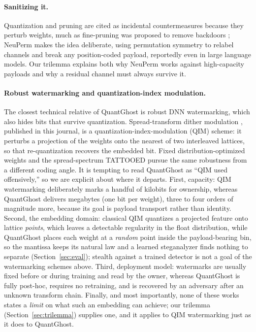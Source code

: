 \documentclass[a4paper,fleqn]{cas-dc}
\theoremstyle{plain}
\theoremstyle{remark}
\newcommand{\sys}{\mbox{QuantGhost}}
\begin{document}
\paragraph{Sanitizing it.} Quantization and pruning are cited as incidental
countermeasures because they perturb weights, much as fine-pruning was proposed to
remove backdoors \citep{liu2018finepruning}; NeuPerm \citep{gilkarov2025neuperm} makes
the idea deliberate, using permutation symmetry to relabel channels and break any
position-coded payload, reportedly even in large language models. Our trilemma explains
both why NeuPerm works against high-capacity payloads and why a residual channel must
always survive it.

\paragraph{Robust watermarking and quantization-index modulation.} The closest
technical relative of \sys{} is robust DNN watermarking, which also hides bits that
survive quantization. Spread-transform dither modulation \citep{li2021stdm}, published
in this journal, is a quantization-index-modulation (QIM) scheme: it perturbs a
projection of the weights onto the nearest of two interleaved lattices, so that
re-quantization recovers the embedded bit. Fixed distribution-optimized weights
\citep{tondi2022robust} and the spread-spectrum TATTOOED \citep{pagnotta2022tattooed}
pursue the same robustness from a different coding angle. It is tempting to read \sys{}
as ``QIM used offensively,'' so we are explicit about where it departs. First, capacity:
QIM watermarking deliberately marks a handful of kilobits for ownership, whereas \sys{}
delivers megabytes (one bit per weight), three to four orders of magnitude more, because
its goal is payload transport rather than identity. Second, the embedding domain:
classical QIM quantizes a projected feature onto lattice \emph{points}, which leaves a
detectable regularity in the float distribution, while \sys{} places each weight at a
\emph{random} point inside the payload-bearing bin, so the mantissa keeps its natural law
and a learned steganalyzer finds nothing to separate (Section~\ref{sec:eval}); stealth
against a trained detector is not a goal of the watermarking schemes above. Third,
deployment model: watermarks are usually fixed before or during training and read by the
owner, whereas \sys{} is fully post-hoc, requires no retraining, and is recovered by an
adversary after an unknown transform chain. Finally, and most importantly, none of these
works states a \emph{limit} on what such an embedding can achieve; our trilemma
(Section~\ref{sec:trilemma}) supplies one, and it applies to QIM watermarking just as it
does to \sys{}.
\end{document}
